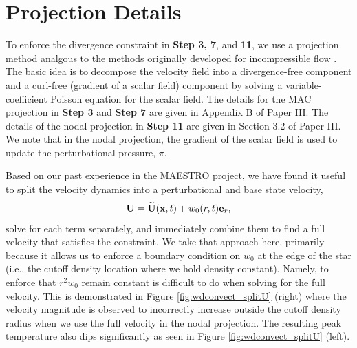 \appendix
\section{Projection Details}\label{Sec:Projection}
To enforce the divergence constraint in {\bf Step 3, 7}, and {\bf 11}, we use a projection method analgous to the methods originally developed for incompressible flow \citep{almgren1998conservative,bell1989second}.
The basic idea is to decompose the velocity field into a divergence-free component and a curl-free (gradient of a scalar field) component by solving a variable-coefficient Poisson equation for the scalar field.
The details for the MAC projection in {\bf Step 3} and {\bf Step 7} are given in Appendix B of Paper III.  The details of the nodal projection in {\bf Step 11} are given in Section 3.2 of Paper III.
We note that in the nodal projection, the gradient of the scalar field is used to update the perturbational pressure, $\pi$.

Based on our past experience in the MAESTRO project, we have found it useful to split the velocity dynamics into a perturbational and base state velocity,
\begin{equation}
\Ub = \Ubt(\xb,t) + w_0(r,t)\eb_r,
\end{equation}
solve for each term separately, and immediately combine them to find a full velocity that satisfies the constraint.  We take that approach here, primarily because it allows us to enforce a boundary condition on $w_0$ at the edge of the star (i.e., the cutoff density location where we hold density constant).  Namely, to enforce that $r^2 w_0$ remain constant is difficult to do when solving for the full velocity. 
This is demonstrated in Figure \ref{fig:wdconvect_splitU} (right) where the velocity magnitude is observed to incorrectly increase outside the cutoff density radius when we use the full velocity in the nodal projection. The resulting peak temperature also dips significantly as seen in Figure \ref{fig:wdconvect_splitU} (left).   

